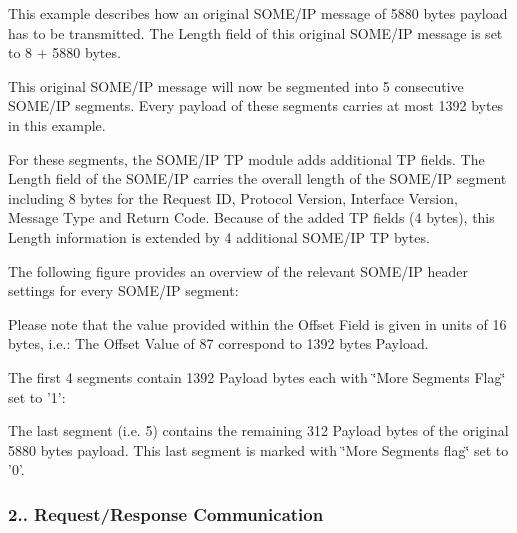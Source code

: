 \begin{DoxyItemize}
\item This example describes how an original S\+O\+M\+E/\+IP message of 5880 bytes payload has to be transmitted. The Length field of this original S\+O\+M\+E/\+IP message is set to 8 + 5880 bytes. 
\item This original S\+O\+M\+E/\+IP message will now be segmented into 5 consecutive S\+O\+M\+E/\+IP segments. Every payload of these segments carries at most 1392 bytes in this example.
\item For these segments, the S\+O\+M\+E/\+IP TP module adds additional TP fields. The Length field of the S\+O\+M\+E/\+IP carries the overall length of the S\+O\+M\+E/\+IP segment including 8 bytes for the Request ID, Protocol Version, Interface Version, Message Type and Return Code. Because of the added TP fields (4 bytes), this Length information is extended by 4 additional S\+O\+M\+E/\+IP TP bytes.
\item The following figure provides an overview of the relevant S\+O\+M\+E/\+IP header settings for every S\+O\+M\+E/\+IP segment\+: 
\item Please note that the value provided within the Offset Field is given in units of 16 bytes, i.\+e.\+: The Offset Value of 87 correspond to 1392 bytes Payload.
\item The first 4 segments contain 1392 Payload bytes each with \char`\"{}\+More Segments Flag\char`\"{} set to ’1’\+: 
\item The last segment (i.\+e. 5) contains the remaining 312 Payload bytes of the original 5880 bytes payload. This last segment is marked with \char`\"{}\+More Segments flag\char`\"{} set to ’0’. 
\end{DoxyItemize}

\subsubsection*{2.. Request/\+Response Communication}


